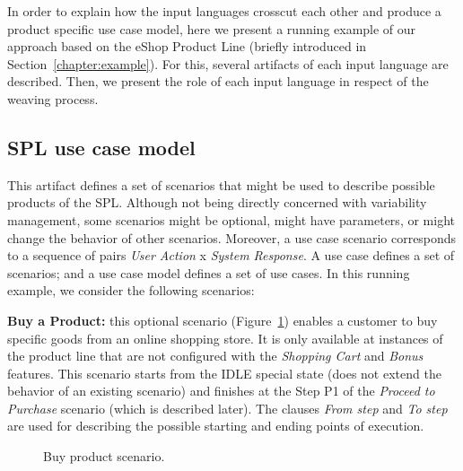 \documentclass[11pt]{report}
\begin{document}
In order to explain how the input languages crosscut each other and produce a
product specific use case model, here we present a running example of our
approach based on the eShop Product Line (briefly introduced in
Section~\ref{chapter:example}). For this, several artifacts of each input language
are described. Then, we present the role of each input language in respect of the
weaving process.


\subsection{SPL use case model}\label{subsub:ucm}

This artifact defines a set of scenarios that might be used to describe possible
products of the SPL. Although not being directly concerned with variability
management, some scenarios might be optional, might have parameters, or might
change the behavior of other scenarios. Moreover, a use case scenario corresponds
to a sequence of pairs \emph{User Action} x \emph{System Response}.  A use case
defines a set of scenarios; and a use case model defines a set of use cases. In
this running example, we consider the following scenarios:

{\bf Buy a Product:} this optional scenario
(Figure~\ref{fig:buy-product-scenario}) enables a customer to buy specific goods
from an online shopping store. It is only available at instances of the product
line that are not configured with the \emph{Shopping Cart} and \emph{Bonus}
features. This scenario starts from the IDLE special state  (does not extend the
behavior of an existing scenario) and finishes at the Step P1 of the
\emph{Proceed to Purchase} scenario (which is described later). The clauses
\emph{From step} and \emph{To step} are used for describing the possible starting
and ending points of execution.

\begin{figure}[h]
 \caption{Buy product scenario.}
\label{fig:buy-product-scenario}
\end{figure}
\end{document}
